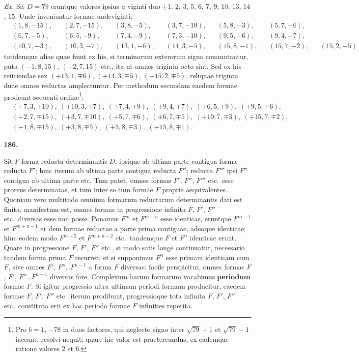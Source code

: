 \documentclass[12pt,a4paper]{article}
\theoremstyle{plain}
\begin{document}
\textit{Ex.} Sit $D = 79$ eruntque valores ipsius $a$ viginti duo $\pm 1$, $2$, $3$, $5$, $6$, $7$, $9$, $10$, $13$, $14$, $15$. Unde inveniuntur formae undeviginti:
\[
\begin{aligned}
&(1,8,-15), &&(2,7,-15), &&(3,8,-5), &&(3,7,-10), &&(5,8,-3), &&(5,7,-6),\\
&(6,7,-5), &&(6,5,-9), &&(7,4,-9), &&(7,3,-10), &&(9,5,-6), &&(9,4,-7),\\
&(10,7,-3), &&(10,3,-7), &&(13,1,-6), &&(14,3,-5), &&(15,8,-1), &&(15,7,-2), &&(15,2,-5)
\end{aligned}
\]
totidemque aliae quae fiunt ex his, si terminorum exterorum signa commutantur, puta $(-1, 8, 15)$, $(-2, 7, 15)$ etc., ita ut omnes triginta octo sint. Sed ex his reiiciendae sex $(+13, 1, \mp 6)$, $(+14, 3, \mp 5)$, $(+15, 2, \mp 5)$, reliquae triginta duae omnes reductas amplectuntur. Per methodum secundam eaedem formae prodeunt sequenti ordine\footnote{Pro $b = 1$, $-78$ in duos factores, qui neglecto signo inter $\sqrt{79} + 1$ et $\sqrt{79} - 1$ iaceant, resolvi nequit; quare hic valor est praetereundus, ex eademque ratione valores $2$ et $6$.}:
\[
\begin{aligned}
&(+7,3,\mp 10), \; (+10,3,\mp 7), \; (+7,4,\mp 9), \; (+9,4,\mp 7), \; (+6,5,\mp 9), \; (+9,5,\mp 6),\\
&(+2,7,\mp 15), \; (+3,7,\mp 10), \; (+5,7,\mp 6), \; (+6,7,\mp 5), \; (+10,7,\mp 3), \; (+15,7,\mp 2),\\
&(+1,8,\mp 15), \; (+3,8,\mp 5), \; (+5,8,\mp 3), \; (+15,8,\mp 1).
\end{aligned}
\]

\bigskip

\textbf{186.}

Sit $F$ forma reducta determinantis $D$, ipsique ab ultima parte contigua forma reducta $F'$; huic iterum ab ultima parte contigua reducta $F''$; reducta $F'''$ ipsi $F''$ contigua ab ultima parte etc. Tum patet, omnes formas $F'$, $F''$, $F'''$ etc.~esse prorsus determinatas, et tum inter se tum formae $F$ proprie aequivalentes. Quoniam vero multitudo omnium formarum reductarum determinantis dati est finita, manifestum est, omnes formas in progressione infinita $F$, $F'$, $F''$ etc.~diversas esse non posse. Ponamus $F^m$ et $F^{m+n}$ esse identicas, eruntque $F^{m-1}$ et $F^{m+n-1}$ ei~dem formae reductae a parte prima contiguae, adeoque identicae; hinc eodem modo $F^{m-2}$ et $F^{m+n-2}$ etc.~tandemque $F$ et $F^n$ identicae erunt. Quare in progressione $F$, $F'$, $F''$ etc., si modo satis longe continuatur, necessario tandem forma prima $F$ recurret; et si supponimus $F^n$ esse primam identicam cum $F$, sive omnes $F'$, $F''$\ldots$F^{n-1}$ a forma $F$ diversas: facile perspicitur, omnes formas $F$, $F'$, $F''$\ldots$F^{n-1}$ diversas fore. Complexum harum formarum vocabimus \textbf{periodum} formae $F$. Si igitur progressio ultra ultimam periodi formam producitur, eaedem formae $F$, $F'$, $F''$ etc.~iterum prodibunt, progressioque tota infinita $F$, $F'$, $F''$ etc.~constituta erit ex hac periodo formae $F$ infinities repetita.
\end{document}
